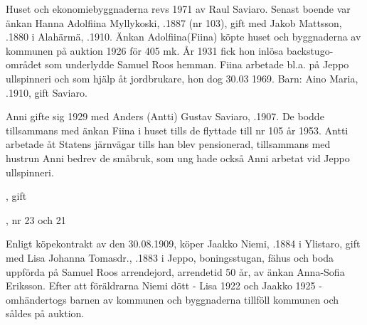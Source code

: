 
Huset och ekonomiebyggnaderna revs 1971 av Raul Saviaro. Senast boende var änkan Hanna Adolfiina Myllykoski, .1887 (nr 103), gift med Jakob Mattsson, .1880 i Alahärmä, .1910. Änkan Adolfiina(Fiina) köpte huset och byggnaderna av kommunen på auktion 1926 för 405 mk. År 1931 fick hon inlösa backstugo-området som underlydde Samuel Roos hemman. Fiina arbetade bl.a. på Jeppo ullspinneri och som hjälp åt jordbrukare, hon dog 30.03 1969.  Barn:  Aino Maria, .1910, gift Saviaro.


Anni gifte sig 1929 med Anders (Antti) Gustav Saviaro, .1907. De bodde tillsammans med änkan Fiina i huset tills de flyttade till nr 105 år 1953. Antti arbetade åt Statens järnvägar tills han blev pensionerad, tillsammans med hustrun Anni bedrev de småbruk, som ung hade också Anni  arbetat vid Jeppo ullspinneri.
\begin{jhchildren}
  \item {}, gift
  \item {}, nr 23 och 21
\end{jhchildren}


Enligt köpekontrakt av den 30.08.1909, köper Jaakko Niemi, .1884 i Ylistaro, gift med Lisa Johanna Tomasdr., .1883 i Jeppo, boningsstugan, fähus och boda uppförda på Samuel Roos arrendejord, arrendetid 50 år, av änkan Anna-Sofia Eriksson. Efter att föräldrarna Niemi dött - Lisa 1922 och Jaakko 1925 - omhändertogs barnen av kommunen och byggnaderna tillföll kommunen och såldes på auktion.
\begin{jhchildren}
  \item {}
  \item {}
  \item {}
  \item {}
  \item {}
\end{jhchildren}


